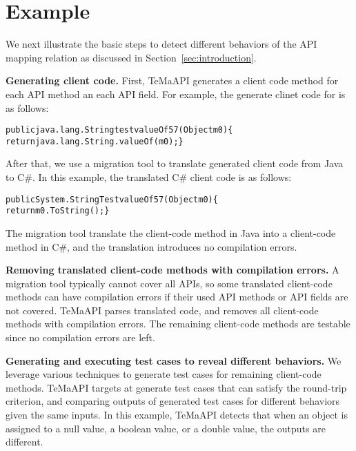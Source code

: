 \section{Example}
\label{sec:example}

We next illustrate the basic steps to detect different behaviors of the API mapping relation as discussed in Section~\ref{sec:introduction}.

\textbf{Generating client code.} First, TeMaAPI generates a client code method for each API method an each API field. For example, the generate clinet code for  is as follows:

\begin{CodeOut}%
\begin{alltt}
  public java.lang.String testvalueOf57(Object m0)\{
    return java.lang.String.valueOf(m0);\}
\end{alltt}
\end{CodeOut}

After that, we use a migration tool to translate generated client code from Java to C\#. In this example, the translated C\# client code is as follows:
\begin{CodeOut}%
\begin{alltt}
public System.String TestvalueOf57(Object m0) \{
			return m0.ToString();\}
\end{alltt}
\end{CodeOut}

The migration tool translate the client-code method in Java into a client-code method in C\#, and the translation introduces no compilation errors.

\textbf{Removing translated client-code methods with compilation errors.} 
A migration tool typically cannot cover all APIs, so some translated client-code methods can have compilation errors if their used API methods or API fields are not covered. TeMaAPI parses translated code, and removes all client-code methods with compilation errors. The remaining client-code methods are testable since no compilation errors are left.

\textbf{Generating and executing test cases to reveal different behaviors.} We leverage various techniques to generate test cases for remaining client-code methods. TeMaAPI targets at generate test cases that can satisfy the round-trip criterion, and comparing outputs of generated test cases for different behaviors given the same inputs. In this example, TeMaAPI detects that when an object is assigned to a null value, a boolean value, or a double value, the outputs are different. 

